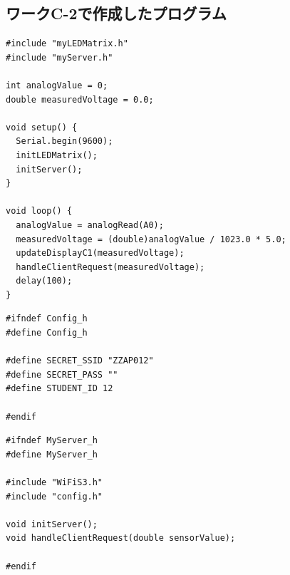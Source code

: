 \subsection{ワークC-2で作成したプログラム}

\begin{lstlisting}[caption={ワークC-2 メインスケッチ (myprm.ino)}, label={lst:c2_myprm}]
#include "myLEDMatrix.h"
#include "myServer.h"

int analogValue = 0;
double measuredVoltage = 0.0;

void setup() {
  Serial.begin(9600);
  initLEDMatrix();
  initServer();
}

void loop() {
  analogValue = analogRead(A0);
  measuredVoltage = (double)analogValue / 1023.0 * 5.0;
  updateDisplayC1(measuredVoltage);
  handleClientRequest(measuredVoltage);
  delay(100);
}
\end{lstlisting}

\begin{lstlisting}[caption={ワークC-2 通信設定ヘッダ (config.h)}, label={lst:c2_config}]
#ifndef Config_h
#define Config_h

#define SECRET_SSID "ZZAP012"
#define SECRET_PASS ""
#define STUDENT_ID 12

#endif
\end{lstlisting}

\begin{lstlisting}[caption={ワークC-2 Webサーバヘッダ (myServer.h)}, label={lst:c2_myserver_h}]
#ifndef MyServer_h
#define MyServer_h

#include "WiFiS3.h"
#include "config.h"

void initServer();
void handleClientRequest(double sensorValue);

#endif
\end{lstlisting}

